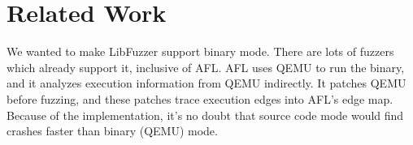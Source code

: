 
\section{Related Work}
\label{sec:related}

  We wanted to make LibFuzzer support binary mode. There are lots of fuzzers which already support it, inclusive of AFL. AFL uses QEMU to run the binary, and it analyzes execution information from QEMU indirectly. It patches QEMU before fuzzing, and these patches trace execution edges into AFL's edge map. Because of the implementation, it’s no doubt that source code mode would find crashes faster than binary (QEMU) mode.

